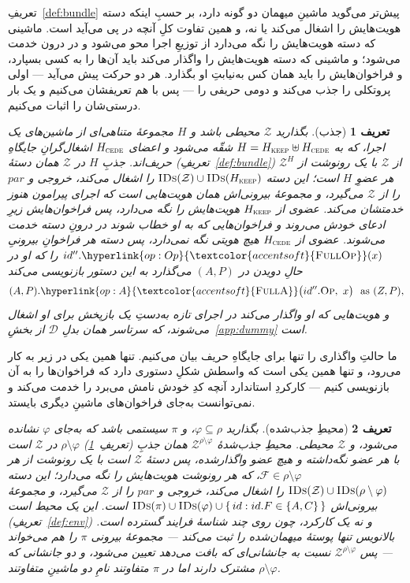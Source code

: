 \documentclass[10pt,oneside,openany]{book}
\newcommand{\pars}{\mathit{par}}
\newcommand{\F}{\mathcal{F}}
\newcommand{\Zenv}{\mathcal{Z}}
\newcommand{\Dum}{\mathcal{D}}
\newcommand{\op}[1]{\textnormal{\textsc{#1}}}
\newcommand{\fopl}[1]{\hyperlink{op:#1}{\textcolor{accentsoft}{\op{Full}\op{#1}}}}
\newcommand{\IDs}{\op{IDs}}
\newcommand{\id}{id}
\newcommand{\Op}{\op{Op}}
\theoremstyle{accentdef}
\newtheorem{definition}{تعریف}[chapter]
\theoremstyle{accentplain}
\begin{document}
تعریفِ~\ref{def:bundle} پیش‌تر می‌گوید ماشینِ میهمان دو گونه دارد، بر حسبِ
اینکه دسته هویت‌هایش را اشغال می‌کند یا نه، و همین تفاوت کلِ آنچه در پی
می‌آید است. ماشینی که دسته هویت‌هایش را نگه می‌دارد از توزیعِ اجرا محو
می‌شود و در درون خدمت می‌شود؛ و ماشینی که دسته هویت‌هایش را واگذار می‌کند
باید آن‌ها را به کسی بسپارد، و فراخوان‌هایش را باید همان کس به‌نیابتِ او
بگذارد. هر دو حرکت پیش می‌آید --- اولی پروتکلی را جذب می‌کند و دومی حریفی
را --- پس با هم تعریفشان می‌کنیم و یک بار درستی‌شان را اثبات می‌کنیم.

\begin{definition}[جذب]\label{def:absorption}
بگذارید $\Zenv$ محیطی باشد و $H$ مجموعهٔ متناهی‌ای از ماشین‌های یک اجرا،
که به $H = H_{\op{keep}} \uplus H_{\op{cede}}$ شقّه می‌شود و اعضای
$H_{\op{cede}}$ اشغال‌گرانِ جایگاهِ حریف‌اند. \emph{جذبِ} $H$ در $\Zenv$
همان دستهٔ (تعریفِ~\ref{def:bundle}) $\Zenv^{H}$ از $\Zenv$ با یک رونوشت
از هر عضوِ $H$ است؛ این دسته $\IDs(\Zenv) \cup \IDs(H_{\op{keep}})$ را
اشغال می‌کند، خروجی و $\pars$ را از $\Zenv$ می‌گیرد، و مجموعهٔ بیرونی‌اش
همان هویت‌هایی است که اجرای پیرامون هنوز خدمتشان می‌کند. عضوی از
$H_{\op{keep}}$ هویت‌هایش را نگه می‌دارد، پس فراخوان‌هایش زیرِ ادعای خودش
می‌روند و فراخوان‌هایی که به او خطاب شوند در درونِ دسته خدمت می‌شوند.
عضوی از $H_{\op{cede}}$ هیچ هویتی نگه نمی‌دارد، پس دسته هر فراخوانِ
بیرونیِ $\id''.\fopl{Op}(x)$ را که او در حالِ دویدن در $(A,P)$ می‌گذارد
به این دستور بازنویسی می‌کند
\[
  (A,P).\fopl{A}\bigl(\id''.\Op,\ x\bigr) \ \text{ as } (Z,P) ,
\]
و هویت‌هایی که او واگذار می‌کند در اجرای تازه به‌دستِ یک \emph{بازپخش}
برای او اشغال می‌شوند، که سرتاسر همان بدلِ $\Dum$ از
بخشِ~\ref{app:dummy} است.
\end{definition}

ما حالتِ واگذاری را تنها برای جایگاهِ حریف بیان می‌کنیم. تنها همین یکی در
زیر به کار می‌رود، و تنها همین یکی است که واسطش شکلِ دستوری دارد که
فراخوان‌ها را به آن بازنویسی کنیم --- کارکردِ استاندارد آنچه کدِ خودش
نامش می‌برد را خدمت می‌کند و نمی‌توانست به‌جای فراخوان‌های ماشینِ دیگری
بایستد.

\begin{definition}[محیطِ جذب‌شده]\label{def:absorb}
بگذارید $\varphi \subseteq \rho$، و $\pi$ سیستمی باشد که به‌جای $\varphi$
نشانده می‌شود، و $\Zenv$ محیطی. محیطِ \emph{جذب‌شدهٔ}
$\Zenv^{\rho \setminus \varphi}$ همان جذبِ
(تعریفِ~\ref{def:absorption}) $\rho \setminus \varphi$ در $\Zenv$ است با
هر عضو نگه‌داشته و هیچ عضو واگذارشده، پس دستهٔ $\Zenv$ است با یک رونوشت
از هر $\F \in \rho \setminus \varphi$، که هر رونوشت هویت‌هایش را نگه
می‌دارد؛ این دسته $\IDs(\Zenv) \cup \IDs(\rho \setminus \varphi)$ را
اشغال می‌کند، خروجی و $\pars$ را از $\Zenv$ می‌گیرد، و مجموعهٔ بیرونی‌اش
$\IDs(\pi) \cup \IDs(\varphi) \cup \{\, \id : \id.F \in \{A,C\} \,\}$
است. این یک محیط است (تعریفِ~\ref{def:env}) و نه یک کارکرد، چون روی چند
شناسهٔ فرایند گسترده است. بالانویس تنها پوستهٔ میهمان‌شده را ثبت می‌کند ---
مجموعهٔ بیرونی $\pi$ را هم می‌خواند --- پس $\Zenv^{\rho \setminus
\varphi}$ نسبت به جانشانی‌ای که بافت می‌دهد تعیین می‌شود، و دو جانشانی که
$\rho \setminus \varphi$ مشترک دارند اما در $\pi$ متفاوتند نامِ دو ماشینِ
متفاوتند.
\end{definition}
\end{document}
